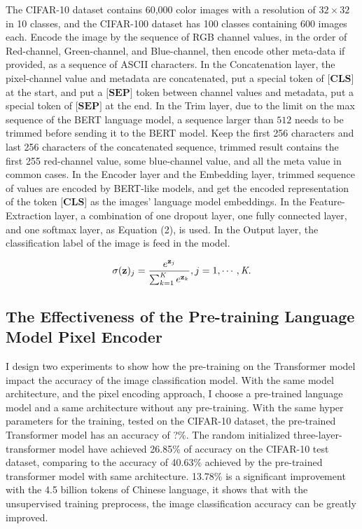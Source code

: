 \documentclass[10pt,twocolumn,letterpaper]{article}
\begin{document}
\par The CIFAR-10 dataset contains 60,000 color images with a resolution of $32\times32$ in 10 classes, and the CIFAR-100 dataset has 100 classes containing 600 images each.
Encode the image by the sequence of RGB channel values, in the order of Red-channel, Green-channel, and Blue-channel,
then encode other meta-data if provided, as a sequence of ASCII characters.
In the Concatenation layer, the pixel-channel value and metadata are concatenated, put a special token of $\textbf{[CLS]}$ at the start,
and put a $\textbf{[SEP]}$ token between channel values and metadata, put a special token of $\textbf{[SEP]}$ at the end.
In the Trim layer, due to the limit on the max sequence of the BERT language model, a sequence larger than $512$ needs to be trimmed before sending it to the BERT model.
Keep the first 256 characters and last 256 characters of the concatenated sequence, trimmed result contains the first 255 red-channel value,
some blue-channel value, and all the meta value in common cases.
In the Encoder layer and the Embedding layer, trimmed sequence of values are encoded by BERT-like models,
and get the encoded representation of the token $\textbf{[CLS]}$ as the images' language model embeddings.
In the Feature-Extraction layer, a combination of one dropout layer, one fully connected layer, and one softmax layer, as Equation (2), is used.
In the Output layer, the classification label of the image is feed in the model.

\begin{equation}
  \sigma(\textbf{z})_j = {e^{\textbf{z}_j} \over {\sum_{k=1}^{\textit{K}} e^{\textbf{z}_k}}}, j=1,\cdots,\textit{K}.
\end{equation}


\subsection{The Effectiveness of the Pre-training Language Model Pixel Encoder}

\par I design two experiments to show how the pre-training on the Transformer model impact the accuracy of the image classification model.
With the same model architecture, and the pixel encoding approach, I choose a pre-trained language model and a same architecture without any pre-training.
With the same hyper parameters for the training, tested on the CIFAR-10 dataset, the pre-trained Transformer model has an accuracy of ?\%.
The random initialized three-layer-transformer model have achieved 26.85\% of accuracy on the CIFAR-10 test dataset, comparing to the accuracy of 40.63\% achieved by the
pre-trained transformer model with same architecture. 13.78\% is a significant improvement with the 4.5 billion tokens of Chinese language, it shows that with the unsupervised
training preprocess, the image classification accuracy can be greatly improved.
\end{document}

